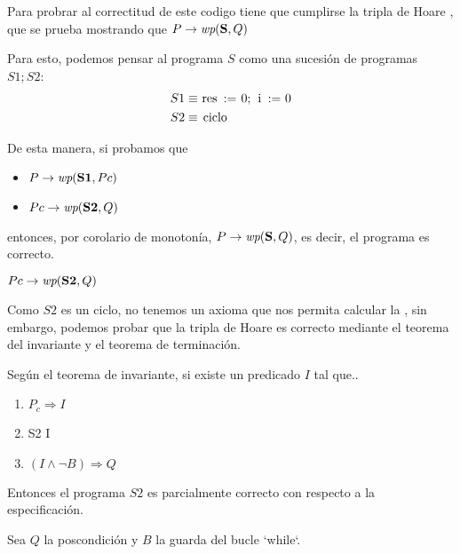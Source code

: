 \documentclass[10pt,a4paper]{article}
\begin{document}

Para probrar al correctitud de este codigo tiene que cumplirse la tripla de Hoare , que se prueba mostrando que $P \Then \wp{S}{Q}$

Para esto, podemos pensar al programa $S$ como una sucesión de programas $S1;S2$:
%
\begin{align*}
	S1 & \equiv \lstinline|res := 0; i := 0| \\
	S2 & \equiv \lstinline|ciclo|
\end{align*}

De esta manera, si probamos que

\begin{itemize}
	\item $P \Then \wp{S1}{Pc}$
	\item $Pc \Then \wp{S2}{Q}$
\end{itemize}

entonces, por corolario de monotonía, $P \Then \wp{S}{Q}$, es decir, el programa es correcto.
\bigskip

{\large$Pc \Then \wp{S2}{Q}$}
\medskip

Como $S2$ es un ciclo, no tenemos un axioma que nos permita calcular la , sin embargo, podemos probar que la tripla de Hoare  es correcto mediante el teorema del invariante y el teorema de terminación.
\pagebreak

Según el teorema de invariante, si existe un predicado $I$ tal que.. \par

\begin{enumerate}
	\item $P_c \Longrightarrow I$
	\item {} {S2} {I}
	\item $(I \wedge  \neg B) \Longrightarrow Q$
\end{enumerate}

Entonces el programa $S2$ es parcialmente correcto con respecto a la especificación.
\bigskip

Sea \( Q\) la poscondición y \( B \) la guarda del bucle `while`.
\end{document}
